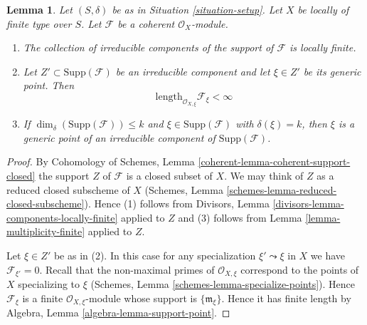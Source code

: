 \documentclass[10pt,a4paper]{amsart}
\theoremstyle{plain}
\newtheorem{lemma}[subsection]{Lemma}
\theoremstyle{definition}
\theoremstyle{remark}
\numberwithin{equation}{subsection}
\begin{document}
\begin{lemma}
\label{lemma-length-finite}
Let $(S, \delta)$ be as in Situation \ref{situation-setup}.
Let $X$ be locally of finite type over $S$.
Let $\mathcal{F}$ be a coherent $\mathcal{O}_X$-module.
\begin{enumerate}
\item The collection of irreducible components of the support of
$\mathcal{F}$ is locally finite.
\item Let $Z' \subset \text{Supp}(\mathcal{F})$
be an irreducible component and
let $\xi \in Z'$ be its generic point.
Then
$$
\text{length}_{\mathcal{O}_{X, \xi}} \mathcal{F}_\xi < \infty
$$
\item If $\dim_\delta(\text{Supp}(\mathcal{F})) \leq k$
and $\xi \in \text{Supp}(\mathcal{F})$ with $\delta(\xi) = k$, then $\xi$ is a
generic point of an irreducible component of $\text{Supp}(\mathcal{F})$.
\end{enumerate}
\end{lemma}

\begin{proof}
By Cohomology of Schemes, Lemma \ref{coherent-lemma-coherent-support-closed}
the support $Z$ of $\mathcal{F}$ is a closed subset of $X$.
We may think of $Z$ as a reduced closed subscheme of $X$
(Schemes, Lemma \ref{schemes-lemma-reduced-closed-subscheme}).
Hence (1) follows from
Divisors, Lemma \ref{divisors-lemma-components-locally-finite} applied to $Z$
and (3) follows from
Lemma \ref{lemma-multiplicity-finite} applied to $Z$.

\medskip\noindent
Let $\xi \in Z'$ be as in (2). In this case for any specialization
$\xi' \leadsto \xi$ in $X$ we have $\mathcal{F}_{\xi'} = 0$.
Recall that the non-maximal primes of $\mathcal{O}_{X, \xi}$ correspond
to the points of $X$ specializing to $\xi$
(Schemes, Lemma \ref{schemes-lemma-specialize-points}).
Hence $\mathcal{F}_\xi$ is a finite $\mathcal{O}_{X, \xi}$-module
whose support is $\{\mathfrak m_\xi\}$. Hence it has finite length
by Algebra, Lemma \ref{algebra-lemma-support-point}.
\end{proof}
\end{document}
